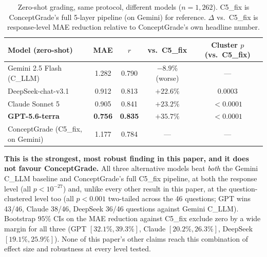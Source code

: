 \documentclass[conference]{IEEEtran}
\begin{document}
\begin{table}[t]
\caption{Zero-shot grading, same protocol, different models
($n=1{,}262$). C5\_fix is ConceptGrade's full 5-layer pipeline (on
Gemini) for reference. $\Delta$ vs.\ C5\_fix is response-level MAE
reduction relative to ConceptGrade's own headline number.}
\label{tab:frontier}
\centering
\footnotesize
\begin{tabular}{lcccc}
\toprule
\textbf{Model (zero-shot)} & \textbf{MAE} & \textbf{$r$} & \textbf{vs.\ C5\_fix} & \textbf{Cluster $p$ (vs.\ C5\_fix)} \\
\midrule
Gemini 2.5 Flash (C\_LLM) & 1.282 & 0.790 & $-8.9\%$ (worse) & --- \\
DeepSeek-chat-v3.1        & 0.912 & 0.813 & $+22.6\%$ & $0.0003$ \\
Claude Sonnet 5           & 0.905 & 0.841 & $+23.2\%$ & $<0.0001$ \\
\textbf{GPT-5.6-terra}    & \textbf{0.756} & \textbf{0.835} & \textbf{$+35.7\%$} & $<0.0001$ \\
\midrule
ConceptGrade (C5\_fix, on Gemini) & 1.177 & 0.784 & --- & --- \\
\bottomrule
\end{tabular}
\end{table}

\textbf{This is the strongest, most robust finding in this paper, and
it does not favour ConceptGrade.} All three alternative models beat
\emph{both} the Gemini C\_LLM baseline and ConceptGrade's full C5\_fix
pipeline, at both the response level (all $p<10^{-27}$) and, unlike
every other result in this paper, at the question-clustered level too
(all $p<0.001$ two-tailed across the 46 questions; GPT wins 43/46,
Claude 38/46, DeepSeek 36/46 questions against Gemini C\_LLM). Bootstrap
$95\%$ CIs on the MAE reduction against C5\_fix exclude zero by a wide
margin for all three (GPT $[32.1\%, 39.3\%]$, Claude $[20.2\%,
26.3\%]$, DeepSeek $[19.1\%, 25.9\%]$). None of this paper's other
claims reach this combination of effect size and robustness at every
level tested.
\end{document}
